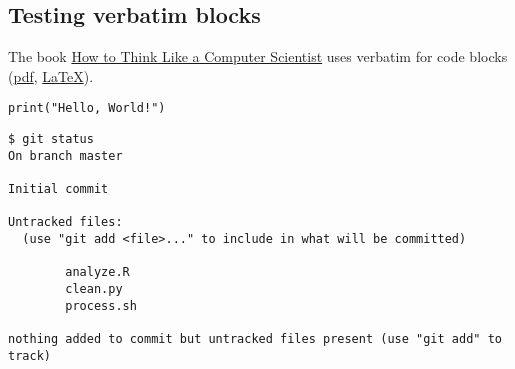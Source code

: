 \subsection{Testing verbatim blocks}

The book \href{http://www.greenteapress.com/thinkpython/}{How to Think Like a Computer Scientist} uses verbatim for code blocks (\href{http://www.greenteapress.com/thinkpython/thinkCSpy.pdf}{pdf}, \href{https://github.com/AllenDowney/ThinkPython/blob/master/book/book.tex}{LaTeX}).

\begin{verbatim}
print("Hello, World!")
\end{verbatim}

\begin{verbatim}
$ git status
On branch master

Initial commit

Untracked files:
  (use "git add <file>..." to include in what will be committed)

        analyze.R
        clean.py
        process.sh

nothing added to commit but untracked files present (use "git add" to track)
\end{verbatim}
